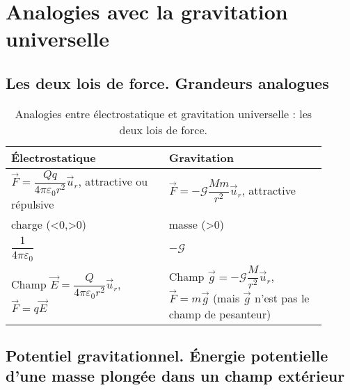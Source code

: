 \section{Analogies avec la gravitation universelle}

    \subsection{Les deux lois de force. Grandeurs analogues}

    \begin{table}
        \centering
        \begin{tabular}{p{0.45\linewidth}|p{0.45\linewidth}}
            \toprule
            Électrostatique & Gravitation \\ \midrule
            $\vec{F}=\dfrac{Qq}{4\pi\varepsilon_0 r^{2}}\vec{u}_r$, attractive ou répulsive& $\vec{F}=-\mathcal{G}\dfrac{Mm}{r^{2}}\vec{u}_r$, attractive\\ \midrule
            charge (<0,>0)& masse (>0)\\ \midrule
            $\dfrac{1}{4\pi\varepsilon_0}$&$-\mathcal{G}$\\ \midrule
            Champ $\vec{E}=\dfrac{Q}{4\pi\varepsilon_0 r^{2}}\vec{u}_r$, $\vec{F}=q\vec{E}$ & Champ $\vec{g}=-\mathcal{G}\dfrac{M}{r^{2}}\vec{u}_r$, $\vec{F}=m\vec{g}$ (mais $\vec{g}$ n'est pas le champ de pesanteur)\\ \bottomrule
        \end{tabular}    
        \caption{Analogies entre électrostatique et gravitation universelle : les deux lois de force.}
        \label{tab:analogie_gravitation_universelle_lois_de_force}
    \end{table}

    \subsection{Potentiel gravitationnel. Énergie potentielle d'une masse plongée dans un champ extérieur}

